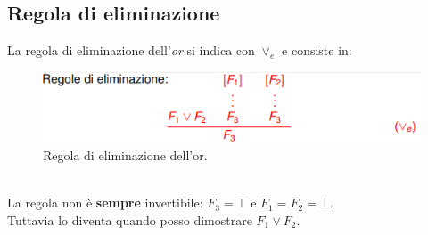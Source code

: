 \documentclass[12pt]{article}
\begin{document}
\subsection{Regola di eliminazione}
La regola di eliminazione dell'\textit{or} si indica con $\vee_e$ e consiste in:
\begin{figure}[!htb]
    \centering
    \includegraphics[width=.9\linewidth,height=.40\textheight,keepaspectratio]{logica_proposizionale/introduzione/eliminazione_or.png} %
    \begin{center}
        \caption{\label{fig:eliminazione_or}Regola di eliminazione dell'or.} %
    \end{center}
\end{figure}\\
La regola non è \textbf{sempre} invertibile: $F_3 = \top$ e $F_1 = F_2 = \bot$.\\
Tuttavia lo diventa quando posso dimostrare $F_1 \vee F_2$.
\pagebreak
\end{document}
